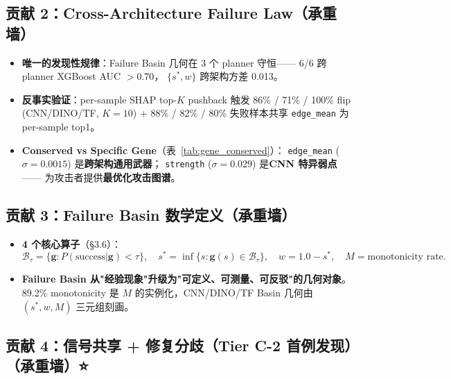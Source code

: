 \documentclass[a4paper,12pt,fontset=fandol]{ctexart}
\newcommand{\gene}[1]{\texttt{#1}}
\begin{document}
{\subsection{贡献 2：Cross-Architecture Failure Law（\textbf{承重墙}）}

\begin{itemize}
\item \textbf{唯一的发现性规律}：Failure Basin 几何在 3 个 planner 守恒——
      6/6 跨 planner XGBoost AUC $> 0.70$，
      $\{s^*, w\}$ 跨架构方差 0.013。
\item \textbf{反事实验证}：per-sample SHAP top-$K$ pushback
      触发 86\% / 71\% / 100\% flip (CNN/DINO/TF, $K\!=\!10$)
      + 88\% / 82\% / 80\% 失败样本共享 \gene{edge\_mean} 为 per-sample top1。
\item \textbf{Conserved vs Specific Gene}（表~\ref{tab:gene_conserved}）：
      \gene{edge\_mean} ($\sigma = 0.0015$) 是\textbf{跨架构通用武器}；
      \gene{strength} ($\sigma = 0.029$) 是\textbf{CNN 特异弱点}——
      为攻击者提供\textbf{最优化攻击图谱}。
\end{itemize}

\subsection{贡献 3：Failure Basin 数学定义（\textbf{承重墙}）}

\begin{itemize}
\item \textbf{4 个核心算子}（§3.6）：
      \begin{equation*}
        \mathcal{B}_{\tau} = \{\mathbf{g} : P(\text{success}|\mathbf{g}) < \tau\},
        \quad
        s^* = \inf\{s : \mathbf{g}(s) \in \mathcal{B}_{\tau}\},
        \quad
        w = 1.0 - s^*,
        \quad
        M = \text{monotonicity rate}.
      \end{equation*}
\item \textbf{Failure Basin 从"经验现象"升级为"可定义、可测量、可反驳"的几何对象}。
      89.2\% monotonicity 是 $M$ 的实例化，CNN/DINO/TF
      Basin 几何由 $(s^*, w, M)$ 三元组刻画。
\end{itemize}

\subsection{贡献 4：信号共享 + 修复分歧（Tier C-2 首例发现）（\textbf{承重墙}）⭐}

}
\end{document}
